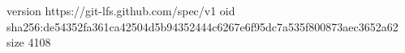version https://git-lfs.github.com/spec/v1
oid sha256:de54352fa361ca42504d5b94352444c6267e6f95dc7a535f800873aec3652a62
size 4108
